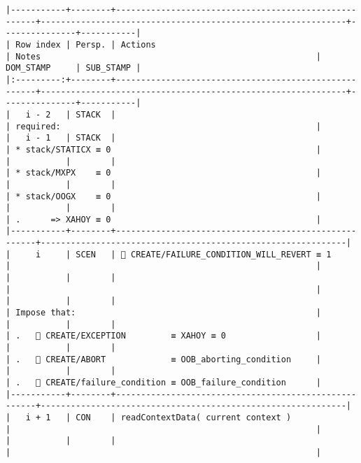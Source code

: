 \documentclass[varwidth=\maxdimen,margin=0.5cm,multi={verbatim}]{standalone}
\begin{document}
\begin{verbatim}
|-----------+--------+------------------------------------------------------+-------------------------------------------------------------+---------------+-----------|
| Row index | Persp. | Actions                                              | Notes                                                       | DOM_STAMP     | SUB_STAMP |
|:---------:+--------+------------------------------------------------------+-------------------------------------------------------------+---------------+-----------|
|   i - 2   | STACK  |                                                      | required:                                                   |
|   i - 1   | STACK  |                                                      | * stack/STATICX ≡ 0                                         |
|           |        |                                                      | * stack/MXPX    ≡ 0                                         |
|           |        |                                                      | * stack/OOGX    ≡ 0                                         |
|           |        |                                                      | .      => XAHOY ≡ 0                                         |
|-----------+--------+------------------------------------------------------+-------------------------------------------------------------|
|     i     | SCEN   |  CREATE/FAILURE_CONDITION_WILL_REVERT ≡ 1           |                                                             |
|           |        |                                                      |                                                             |
|           |        |                                                      | Impose that:                                                |
|           |        |                                                      | .    CREATE/EXCEPTION         ≡ XAHOY ≡ 0                  |
|           |        |                                                      | .    CREATE/ABORT             ≡ OOB_aborting_condition     |
|           |        |                                                      | .    CREATE/failure_condition ≡ OOB_failure_condition      |
|-----------+--------+------------------------------------------------------+-------------------------------------------------------------|
|   i + 1   | CON    | readContextData( current context )                   |                                                             |
|           |        |                                                      |                                                             |

\end{verbatim}
\end{document}
